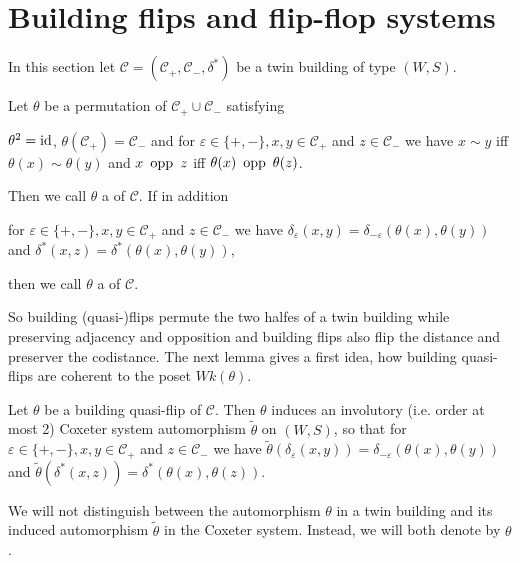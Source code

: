 \section{Building flips and flip-flop systems}
In this section let $\mathcal C = (\mathcal C_+, \mathcal C_-, \delta^*)$ be a twin building of type $(W,S)$.

\begin{defi}
	Let $\theta$ be a permutation of $\mathcal C_+ \cup \mathcal C_-$ satisfying
	\begin{axioms}
		 $\theta^2 = \operatorname{id}$,
		 $\theta(\mathcal C_+) = \mathcal C_-$ and
		 for $\varepsilon \in \{+,-\}, x,y \in \mathcal C_+$ and $z \in \mathcal C_-$ we have $x \sim y$ iff $\theta(x) \sim \theta(y)$ and $x \opp z$ iff $\theta(x) \opp \theta(z)$.
	\end{axioms}
	Then we call $\theta$ a  of $\mathcal{C}$. If in addition
	\begin{axioms}
		 for $\varepsilon \in \{+,-\}, x,y \in \mathcal C_+$ and $z \in \mathcal C_-$ we have $\delta_\varepsilon(x,y) = \delta_{-\varepsilon}(\theta(x),\theta(y))$ and $\delta^*(x,z) = \delta^*(\theta(x),\theta(y))$, 
	\end{axioms}
	then we call $\theta$ a  of $\mathcal C$.
\end{defi}

So building (quasi-)flips permute the two halfes of a twin building while preserving adjacency and opposition and building flips also flip the distance and preserver the codistance. The next lemma gives a first idea, how building quasi-flips are coherent to the poset $Wk(\theta)$.

\begin{lemm}
	Let $\theta$ be a building quasi-flip of $\mathcal C$. Then $\theta$ induces an involutory (i.e. order at most 2) Coxeter system automorphism $\tilde \theta$ on $(W,S)$, so that for $\varepsilon \in \{+,-\}, x,y \in \mathcal C_+$ and $z \in \mathcal C_-$ we have $\tilde \theta(\delta_\varepsilon(x,y)) = \delta_{-\varepsilon}(\theta(x), \theta(y))$ and $\tilde \theta(\delta^*(x,z)) = \delta^*(\theta(x), \theta(z))$.
\end{lemm}

\begin{rema}
	We will not distinguish between the automorphism $\theta$ in a twin building and its induced automorphism $\tilde \theta$ in the Coxeter system. Instead, we will both denote by $\theta$.
\end{rema}

